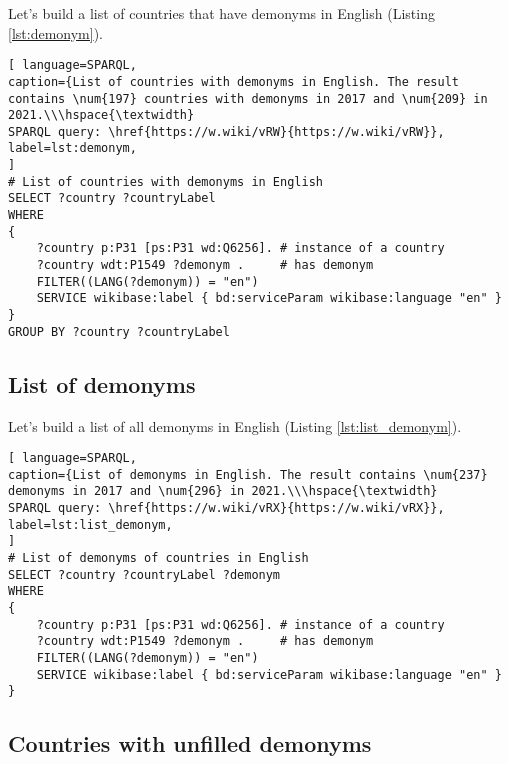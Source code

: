 Let's build a list of countries that have demonyms in English (Listing \ref{lst:demonym}).

\begin{lstlisting}[ language=SPARQL, 
caption={List of countries with demonyms in English. The result contains \num{197} countries with demonyms in 2017 and \num{209} in 2021.\\\hspace{\textwidth}
SPARQL query: \href{https://w.wiki/vRW}{https://w.wiki/vRW}},
label=lst:demonym, 
]
# List of countries with demonyms in English
SELECT ?country ?countryLabel 
WHERE
{
	?country p:P31 [ps:P31 wd:Q6256]. # instance of a country
	?country wdt:P1549 ?demonym .     # has demonym
	FILTER((LANG(?demonym)) = "en")
	SERVICE wikibase:label { bd:serviceParam wikibase:language "en" }
}
GROUP BY ?country ?countryLabel
\end{lstlisting}



\subsection{List of demonyms}

Let's build a list of all demonyms in English (Listing \ref{lst:list_demonym}).

\begin{lstlisting}[ language=SPARQL, 
caption={List of demonyms in English. The result contains \num{237} demonyms in 2017 and \num{296} in 2021.\\\hspace{\textwidth}
SPARQL query: \href{https://w.wiki/vRX}{https://w.wiki/vRX}},
label=lst:list_demonym, 
]
# List of demonyms of countries in English
SELECT ?country ?countryLabel ?demonym
WHERE
{
	?country p:P31 [ps:P31 wd:Q6256]. # instance of a country
	?country wdt:P1549 ?demonym .     # has demonym
	FILTER((LANG(?demonym)) = "en")
	SERVICE wikibase:label { bd:serviceParam wikibase:language "en" }
}
\end{lstlisting}



\subsection{Countries with unfilled demonyms}

